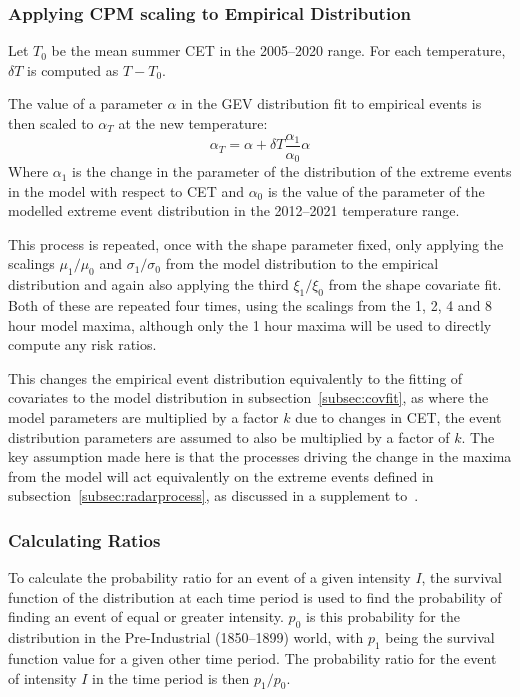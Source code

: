 \subsubsection{Applying CPM scaling to Empirical Distribution}

Let $T_0$ be the mean summer CET in the 2005--2020 range.
For each temperature, $\delta T$ is computed as $T - T_0$.

The value of a parameter $\alpha$ in the GEV distribution fit to empirical events is then scaled to $\alpha_T$ at the new temperature:
\begin{equation}\label{eq:newradarparams}
    \alpha_T = \alpha + \delta T \frac{\alpha_1}{\alpha_0} \alpha
\end{equation}
Where $\alpha_1$ is the change in the parameter of the distribution of the extreme events in the model with respect to CET and
    $\alpha_0$ is the value of the parameter of the modelled extreme event distribution in the 2012--2021 temperature range.

This process is repeated, once with the shape parameter fixed, only applying the scalings $\mu_1 / \mu_0$ and $\sigma_1 / \sigma_0$
    from the model distribution to the empirical distribution and again also applying the third $\xi_1 / \xi_0$ from the shape covariate fit.
Both of these are repeated four times, using the scalings from the 1, 2, 4 and 8 hour model maxima,
    although only the 1 hour maxima will be used to directly compute any risk ratios.

This changes the empirical event distribution equivalently to the fitting of covariates to the model distribution in subsection~\ref{subsec:covfit},
    as where the model parameters are multiplied by a factor $k$ due to changes in CET,
    the event distribution parameters are assumed to also be multiplied by a factor of $k$.
The key assumption made here is that the processes driving the change in the maxima from the model will act equivalently
    on the extreme events defined in subsection~\ref{subsec:radarprocess}, as discussed in a supplement to~\cite{Tett_Soon}.

\subsubsection{Calculating Ratios}

To calculate the probability ratio for an event of a given intensity $I$,
    the survival function of the distribution at each time period is used to find the probability of finding an event of equal or greater intensity.
$p_0$ is this probability for the distribution in the Pre-Industrial (1850--1899) world,
    with $p_1$ being the survival function value for a given other time period.
The probability ratio for the event of intensity $I$ in the time period is then $p_1/p_0$.

